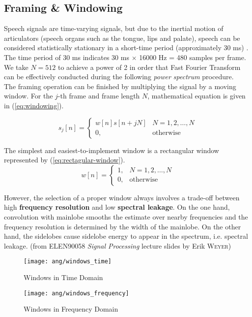 \subsection{Framing \& Windowing}

Speech signals are time-varying signals, but due to the inertial motion of articulators (speech organs such as the tongue, lips and palate), speech can be considered statistically stationary in a short-time period (approximately 30 ms) \cite{brandstein1995practical}. The time period of 30 ms indicates 30 ms $\times$ 16000 Hz = 480 samples per frame. We take $N = 512$ to achieve a power of 2 in order that Fast Fourier Transform can be effectively conducted during the following \textit{power spectrum} procedure.\\

The framing operation can be finished by multiplying the signal by a moving window. For the $j$-th frame and frame length $N$, mathematical equation is given in (\ref{eq:windowing}).

\begin{equation}
\label{eq:windowing}
s_j[n] =
\begin{cases}
w[n] s[n+jN] & N = 1, 2, \dots, N\\
0, & \text{otherwise}
\end{cases}
\end{equation}

The simplest and easiest-to-implement window is a rectangular window represented by (\ref{eq:rectagular-window}).
\begin{equation}
\label{eq:rectagular-window}
w[n] =
\begin{cases}
1, & N = 1, 2, \dots, N\\
0, & \text{otherwise}
\end{cases}
\end{equation}

However, the selection of a proper window always involves a trade-off between high \textbf{frequency resolution} and low \textbf{spectral leakage}. On the one hand, convolution with mainlobe smooths the estimate over nearby frequencies and the frequency resolution is determined by the width of the mainlobe. On the other hand, the sidelobes cause sidelobe energy to appear in the spectrum, i.e. spectral leakage. (from ELEN90058 \textit{Signal Processing} lecture slides by Erik \textsc{Weyer})

\begin{figure}[H]
\begin{minipage}[t]{0.5\linewidth}
\centering
\texttt{[image: ang/windows\_time]}
\caption{Windows in Time Domain}
\label{windows_time}
\end{minipage}
\begin{minipage}[t]{0.5\linewidth}
\centering
\texttt{[image: ang/windows\_frequency]}
\caption{Windows in Frequency Domain}
\label{windows_frequency}
\end{minipage}
\end{figure}

